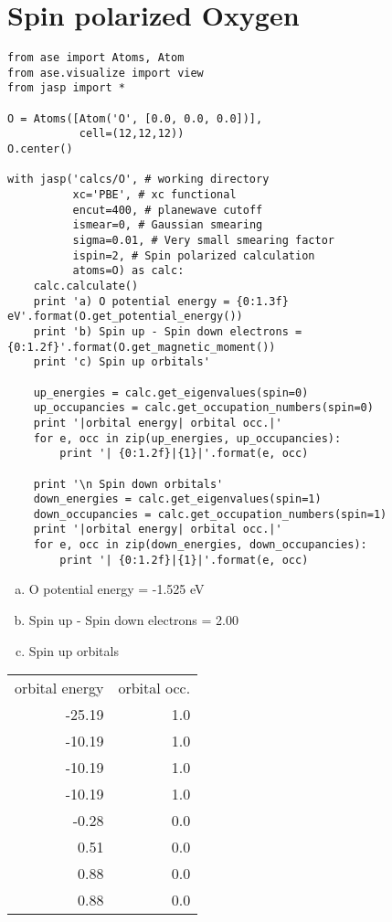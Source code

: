 \documentclass[11pt]{article}
\begin{document}
\section{Spin polarized Oxygen}
\label{sec-3}

\begin{verbatim}
from ase import Atoms, Atom
from ase.visualize import view
from jasp import *

O = Atoms([Atom('O', [0.0, 0.0, 0.0])],
           cell=(12,12,12))
O.center()

with jasp('calcs/O', # working directory
          xc='PBE', # xc functional
          encut=400, # planewave cutoff
          ismear=0, # Gaussian smearing
          sigma=0.01, # Very small smearing factor
          ispin=2, # Spin polarized calculation
          atoms=O) as calc:
    calc.calculate()
    print 'a) O potential energy = {0:1.3f} eV'.format(O.get_potential_energy())
    print 'b) Spin up - Spin down electrons = {0:1.2f}'.format(O.get_magnetic_moment())
    print 'c) Spin up orbitals'

    up_energies = calc.get_eigenvalues(spin=0)
    up_occupancies = calc.get_occupation_numbers(spin=0)
    print '|orbital energy| orbital occ.|'
    for e, occ in zip(up_energies, up_occupancies):
        print '| {0:1.2f}|{1}|'.format(e, occ)

    print '\n Spin down orbitals'
    down_energies = calc.get_eigenvalues(spin=1)
    down_occupancies = calc.get_occupation_numbers(spin=1)
    print '|orbital energy| orbital occ.|'
    for e, occ in zip(down_energies, down_occupancies):
        print '| {0:1.2f}|{1}|'.format(e, occ)
\end{verbatim}

\begin{enumerate}[(a)]
\item O potential energy = -1.525 eV
\item Spin up - Spin down electrons = 2.00
\item Spin up orbitals
\end{enumerate}
\begin{center}
\begin{tabular}{rr}
orbital energy & orbital occ.\\
-25.19 & 1.0\\
-10.19 & 1.0\\
-10.19 & 1.0\\
-10.19 & 1.0\\
-0.28 & 0.0\\
0.51 & 0.0\\
0.88 & 0.0\\
0.88 & 0.0\\
\end{tabular}
\end{center}
\end{document}
